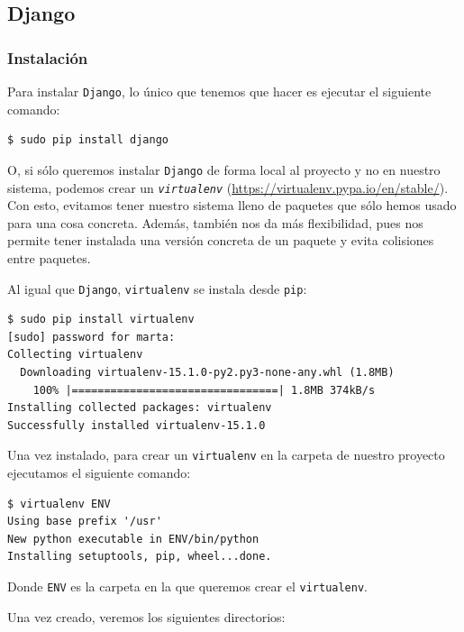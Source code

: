 \subsection{Django}
\subsubsection{Instalación}
Para instalar \texttt{Django}, lo único que tenemos que hacer es ejecutar el siguiente comando:

\begin{verbatim}
$ sudo pip install django
\end{verbatim}

O, si sólo queremos instalar \texttt{Django} de forma local al proyecto y no en nuestro sistema, podemos crear un \texttt{\textit{virtualenv}} (\url{https://virtualenv.pypa.io/en/stable/}). Con esto, evitamos tener nuestro sistema lleno de paquetes que sólo hemos usado para una cosa concreta. Además, también nos da más flexibilidad, pues nos permite tener instalada una versión concreta de un paquete y evita colisiones entre paquetes. 

Al igual que \texttt{Django}, \texttt{virtualenv} se instala desde \texttt{pip}:

\begin{verbatim}
$ sudo pip install virtualenv
[sudo] password for marta: 
Collecting virtualenv
  Downloading virtualenv-15.1.0-py2.py3-none-any.whl (1.8MB)
    100% |================================| 1.8MB 374kB/s 
Installing collected packages: virtualenv
Successfully installed virtualenv-15.1.0
\end{verbatim}

Una vez instalado, para crear un \texttt{virtualenv} en la carpeta de nuestro proyecto ejecutamos el siguiente comando:

\begin{verbatim}
$ virtualenv ENV
Using base prefix '/usr'
New python executable in ENV/bin/python
Installing setuptools, pip, wheel...done.
\end{verbatim}

Donde \texttt{ENV} es la carpeta en la que queremos crear el \texttt{virtualenv}. 

Una vez creado, veremos los siguientes directorios:


